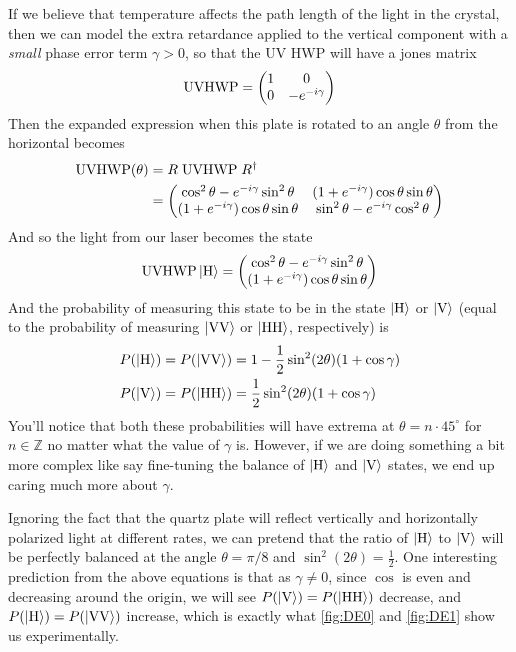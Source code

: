 If we believe that temperature affects the path length of the light in the crystal, then we can model the extra retardance applied to the vertical component with a \textit{small} phase error term $\gamma > 0$, so that the UV HWP will have a jones matrix
\begin{equation}
	\text{\rmfamily UVHWP\normalfont} = \begin{pmatrix}
		1 & 0 \\ 0 & -e^{-i\gamma}
	\end{pmatrix}
\end{equation}
Then the expanded expression when this plate is rotated to an angle $\theta$ from the horizontal becomes
\begin{align}
	\text{\rmfamily UVHWP\normalfont}(\theta) &= R\;\text{\rmfamily UVHWP\normalfont}\; R^\dagger \\
	&= \begin{pmatrix}
		\cos^2\theta - e^{-i\gamma}\sin^2\theta & (1+e^{-i\gamma})\cos\theta\sin\theta \\
		(1+e^{-i\gamma})\cos\theta\sin\theta & \sin^2\theta - e^{-i\gamma}\cos^2\theta
	\end{pmatrix}
\end{align}
And so the light from our laser becomes the state
\begin{equation}
	\text{\rmfamily UVHWP\normalfont}\ket{\text{H}} = \begin{pmatrix}
		\cos^2\theta - e^{-i\gamma}\sin^2\theta \\ (1+e^{-i\gamma})\cos\theta\sin\theta
	\end{pmatrix}
\end{equation}
And the probability of measuring this state to be in the state $\ket{\text{H}}$ or $\ket{\text{V}}$ (equal to the probability of measuring $\ket{\text{VV}}$ or $\ket{\text{HH}}$, respectively) is
\begin{align}
	P(\ket{\text{H}}) = P(\ket{\text{VV}}) &=1-\frac{1}{2}\sin^2(2\theta)(1+\cos\gamma)\\
	P(\ket{\text{V}}) = P(\ket{\text{HH}}) &=\frac{1}{2}\sin^2(2\theta)(1+\cos\gamma)
\end{align}
You'll notice that both these probabilities will have extrema at $\theta = n\cdot 45^\circ$ for $n\in\mathbb{Z}$ no matter what the value of $\gamma$ is. However, if we are doing something a bit more complex like say fine-tuning the balance of $\ket{\text{H}}$ and $\ket{\text{V}}$ states, we end up caring much more about $\gamma$.

Ignoring the fact that the quartz plate will reflect vertically and horizontally polarized light at different rates, we can pretend that the ratio of $\ket{\text{H}}$ to $\ket{\text{V}}$ will be perfectly balanced at the angle $\theta=\pi/8$ and $\sin^2(2\theta) = \frac{1}{2}$. One interesting prediction from the above equations is that as $\gamma\neq 0$, since $\cos$ is even and decreasing around the origin, we will see $P(\ket{\text{V}})=P(\ket{\text{HH}})$ decrease, and $P(\ket{\text{H}})=P(\ket{\text{VV}})$ increase, which is exactly what \cref{fig:DE0} and \cref{fig:DE1} show us experimentally.

